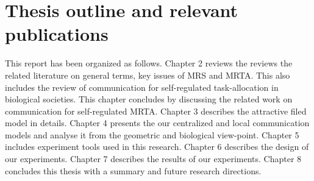 \section{Thesis outline and relevant publications}
This report has been organized as follows.
Chapter 2  reviews the reviews the related literature on general terms, key issues of MRS and MRTA. This also includes the review of communication  for self-regulated task-allocation in biological societies. This chapter concludes by discussing the related work on communication for self-regulated MRTA.
Chapter 3 describes the attractive filed model in details.
Chapter 4 presents the our centralized and local communication models and analyse it  from the geometric and biological view-point. 
Chapter 5 includes experiment tools used in this research.
Chapter 6 describes the design of our experiments.
Chapter 7 describes the results of our experiments.
Chapter 8 concludes this thesis  with a summary and future research directions.




